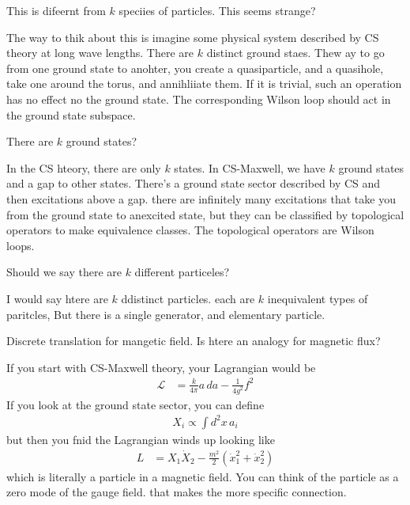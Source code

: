 \begin{question}
    This is difeernt from $k$ speciies of particles.
    This seems strange?
\end{question}
The way to thik about this is imagine some physical system described by CS
theory at long wave lengths.
There are $k$ distinct ground staes.
Thew ay to go from one ground state to anohter,
you create a quasiparticle, and a quasihole,
take one around the torus,
and annihliiate them.
If it is trivial,
such an operation has no effect no the ground state.
The corresponding Wilson loop should act in the ground state subspace.


\begin{question}
    There are $k$ ground states?
\end{question}
In the CS hteory,
there are only $k$ states.
In CS-Maxwell,
we have $k$ ground states and a gap to other states.
There's a ground state sector described by CS and then excitations above a gap.
there are infinitely many excitations that take you from the ground state to
anexcited state,
but they can be classified by topological operators
to make equivalence classes.
The topological operators are Wilson loops.

\begin{question}
Should we say there are $k$ different particeles?
\end{question}
I would say htere are $k$ ddistinct particles.
each are $k$ inequivalent types of paritcles,
But there is a single generator,
and elementary particle.

\begin{question}
    Discrete translation for mangetic field.
    Is htere an analogy for magnetic flux?
\end{question}
If you start with CS-Maxwell theory,
your Lagrangian would be
\begin{align}
    \mathcal{L}
    &=
    \frac{k}{4\pi}a\, da
    -
    \frac{1}{4g^2}f^2
\end{align}
If you look at the ground state sector,
you can define
\begin{align}
    X_i \propto \int d^2x \, a_i
\end{align}
but then you fnid the Lagrangian winds up looking like
\begin{align}
    L &=
    X_1 \dot{X}_2
    -
    \frac{m^2}{2}\left( 
    \dot{x}_1^2
    + \dot{x}_2^2
    \right)
\end{align}
which is literally a particle in a magnetic field.
You can think of the particle as a zero mode of the gauge field.
that makes the more specific connection.

